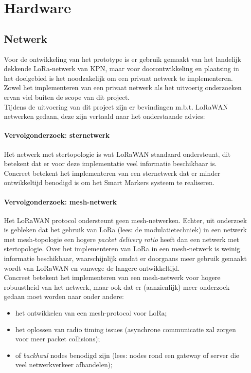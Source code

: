 \section{Hardware}

\subsection{Netwerk}
Voor de ontwikkeling van het prototype is er gebruik gemaakt van het landelijk
dekkende LoRa-netwerk van KPN, maar voor doorontwikkeling en plaatsing in het
doelgebied is het noodzakelijk om een privaat netwerk te implementeren.
Zowel het implementeren van een privaat netwerk als het uitvoerig onderzoeken
ervan viel buiten de scope van dit project. \\
Tijdens de uitvoering van dit project zijn er bevindingen m.b.t. LoRaWAN
netwerken gedaan, deze zijn vertaald naar het onderstaande advies:

\paragraph{Vervolgonderzoek: sternetwerk}
Het netwerk met stertopologie is wat LoRaWAN standaard ondersteunt, dit betekent
dat er voor deze implementatie veel informatie beschikbaar is. \citep{LRSRV} \\
Concreet betekent het implementeren van een sternetwerk dat er minder
ontwikkeltijd benodigd is om het Smart Markers systeem te realiseren.

\paragraph{Vervolgonderzoek: mesh-netwerk}
Het LoRaWAN protocol ondersteunt geen mesh-netwerken. Echter, uit onderzoek is
gebleken dat het gebruik van LoRa (lees: de modulatietechniek) in een netwerk
met mesh-topologie een hogere \textit{packet delivery ratio}
\citep{AIM_HI_LORA_WMN} heeft dan een netwerk met stertopologie. Over het
implementeren van LoRa in een mesh-netwerk is weinig informatie beschikbaar,
waarschijnlijk omdat er doorgaans meer gebruik gemaakt wordt van LoRaWAN en
vanwege de langere ontwikkeltijd. \\
Concreet betekent het implementeren van een mesh-netwerk voor hogere robuustheid
van het netwerk, maar ook dat er (aanzienlijk) meer onderzoek gedaan moet worden
naar onder andere:
\begin{itemize}
    \item het ontwikkelen van een mesh-protocol voor LoRa;
    \item het oplossen van radio timing issues (asynchrone communicatie zal
          zorgen voor meer packet collisions);
    \item of \textit{backhaul} nodes benodigd zijn (lees: nodes rond een gateway
          of server die veel netwerkverkeer afhandelen);
\end{itemize}

